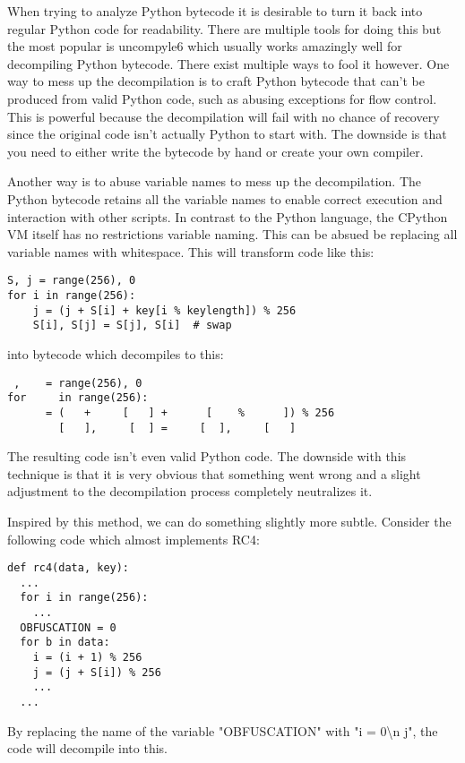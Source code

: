 \documentclass[twocolumn]{article}
\begin{document}
When trying to analyze Python bytecode it is desirable to turn it back into regular Python code for readability. There are multiple tools for doing this but the most popular is uncompyle6 which usually works amazingly well for decompiling Python bytecode. There exist multiple ways to fool it however. One way to mess up the decompilation is to craft Python bytecode that can't be produced from valid Python code, such as abusing exceptions for flow control. This is powerful because the decompilation will fail with no chance of recovery since the original code isn't actually Python to start with. The downside is that you need to either write the bytecode by hand or create your own compiler.

Another way is to abuse variable names to mess up the decompilation. The Python bytecode retains all the variable names to enable correct execution and interaction with other scripts. In contrast to the Python language, the CPython VM itself has no restrictions variable naming. This can be absued be replacing all variable names with whitespace. This will transform code like this:

\begin{verbatim}
S, j = range(256), 0
for i in range(256):
    j = (j + S[i] + key[i % keylength]) % 256
    S[i], S[j] = S[j], S[i]  # swap
\end{verbatim}

into bytecode which decompiles to this:

\begin{verbatim}
 ,    = range(256), 0
for     in range(256):
      = (   +     [   ] +      [    %      ]) % 256
        [   ],     [  ] =     [  ],     [   ]
\end{verbatim}

The resulting code isn't even valid Python code. The downside with this technique is that it is very obvious that something went wrong and a slight adjustment to the decompilation process completely neutralizes it. 

Inspired by this method, we can do something slightly more subtle. Consider the following code which almost implements RC4:

\begin{verbatim}
def rc4(data, key):
  ...
  for i in range(256):
    ...
  OBFUSCATION = 0
  for b in data:
    i = (i + 1) % 256
    j = (j + S[i]) % 256
    ...
  ...
\end{verbatim}

By replacing the name of the variable "OBFUSCATION" with "i = 0\textbackslash n  j", the code will decompile into this.
\end{document}

